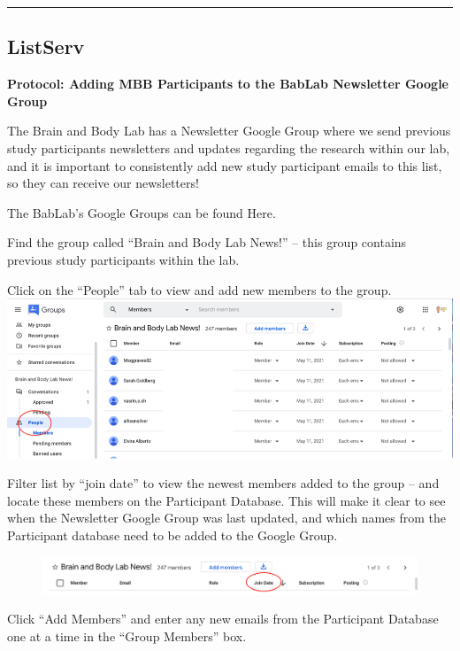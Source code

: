 \documentclass[]{book}
\begin{document}
\begin{center}\rule{0.5\linewidth}{0.5pt}\end{center}

\hypertarget{listserv}{%
\subsection{ListServ}\label{listserv}}

\textbf{Protocol: Adding MBB Participants to the BabLab Newsletter Google Group}

The Brain and Body Lab has a Newsletter Google Group where we send previous study participants newsletters and updates regarding the research within our lab, and it is important to consistently add new study participant emails to this list, so they can receive our newsletters!

The BabLab's Google Groups can be found Here.

Find the group called ``Brain and Body Lab News!'' -- this group contains previous study participants within the lab.

Click on the ``People'' tab to view and add new members to the group.
\includegraphics{images/lab_protocols/listserv/listserv_1.png}

Filter list by ``join date'' to view the newest members added to the group -- and locate these members on the Participant Database. This will make it clear to see when the Newsletter Google Group was last updated, and which names from the Participant database need to be added to the Google Group.

\begin{figure}
\centering
\includegraphics{images/lab_protocols/listserv/listserv_2.png}
\caption{}
\end{figure}

Click ``Add Members'' and enter any new emails from the Participant Database one at a time in the ``Group Members'' box.
\end{document}
